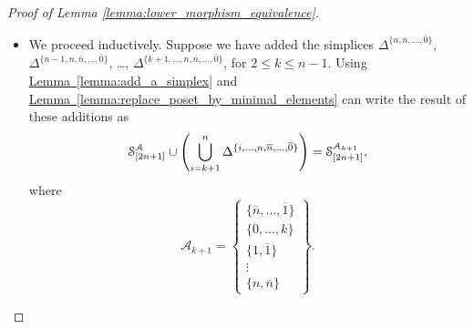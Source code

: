 \documentclass[main.tex]{subfiles}
\begin{document}
\begin{proof}[Proof of Lemma \ref{lemma:lower_morphism_equivalence}]
\begin{enumerate}
\begin{itemize}
        \item We proceed inductively. Suppose we have added the simplices $\Delta^{\{n, \overline{n}, \ldots, \overline{0}\}}$, $\Delta^{\{n-1, n, \overline{n}, \ldots, \overline{0}\}}$, \dots, $\Delta^{\{k+1, \ldots, n, \overline{n}, \ldots, \overline{0}\}}$, for $2 \leq k \leq n-1$. Using \hyperref[lemma:add_a_simplex]{Lemma~\ref*{lemma:add_a_simplex}} and \hyperref[lemma:replace_poset_by_minimal_elements]{Lemma~\ref*{lemma:replace_poset_by_minimal_elements}} can write the result of these additions as
          \begin{equation*}
            \S^{\mathcal{A}}_{[2n+1]} \cup \left( \bigcup_{i = k+1}^{n} \Delta^{\{i, \ldots, n, \overline{n}, \ldots, \overline{0}\}}\right) = \S^{\mathcal{A}_{k+1}}_{[2n+1]},
          \end{equation*}
          where
          \begin{equation*}
            \mathcal{A}_{k+1} = \left\{ \substack{ \{\overline{n}, \ldots, \overline{1}\} \\ \{0, \ldots, k\} \\ \{1, \overline{1}\} \\ \vdots \\ \{n, \overline{n}\} } \right\}.
          \end{equation*}


\end{itemize}
\end{enumerate}
\end{proof}
\end{document}
